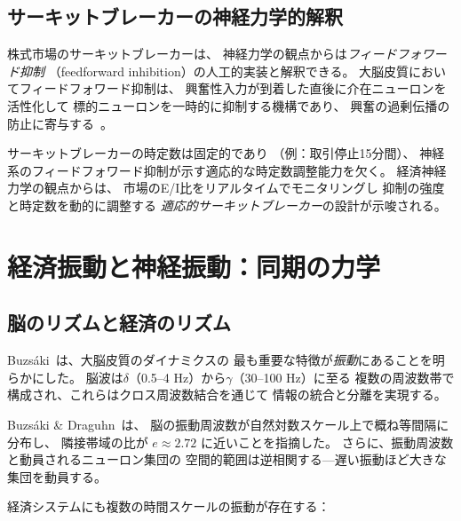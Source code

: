 \documentclass[12pt,twocolumn]{ltjsarticle}
\begin{document}
\subsection{サーキットブレーカーの神経力学的解釈}

株式市場のサーキットブレーカーは、
神経力学の観点からは\emph{フィードフォワード抑制}
（feedforward inhibition）の人工的実装と解釈できる。
大脳皮質においてフィードフォワード抑制は、
興奮性入力が到着した直後に介在ニューロンを活性化して
標的ニューロンを一時的に抑制する機構であり、
興奮の過剰伝播の防止に寄与する~\cite{Pouille2001}。

サーキットブレーカーの時定数は固定的であり
（例：取引停止15分間）、
神経系のフィードフォワード抑制が示す適応的な時定数調整能力を欠く。
経済神経力学の観点からは、
市場のE/I比をリアルタイムでモニタリングし
抑制の強度と時定数を動的に調整する
\emph{適応的サーキットブレーカー}の設計が示唆される。


\section{経済振動と神経振動：同期の力学}
\label{sec:oscillation}

\subsection{脳のリズムと経済のリズム}

Buzs\'{a}ki~\cite{Buzsaki2006}は、大脳皮質のダイナミクスの
最も重要な特徴が\emph{振動}にあることを明らかにした。
脳波は$\delta$（0.5--4 Hz）から$\gamma$（30--100 Hz）に至る
複数の周波数帯で構成され、これらはクロス周波数結合を通じて
情報の統合と分離を実現する。

Buzs\'{a}ki \& Draguhn~\cite{Buzsaki2004}は、
脳の振動周波数が自然対数スケール上で概ね等間隔に分布し、
隣接帯域の比が $e \approx 2.72$ に近いことを指摘した。
さらに、振動周波数と動員されるニューロン集団の
空間的範囲は逆相関する---遅い振動ほど大きな集団を動員する。

経済システムにも複数の時間スケールの振動が存在する：
\end{document}
